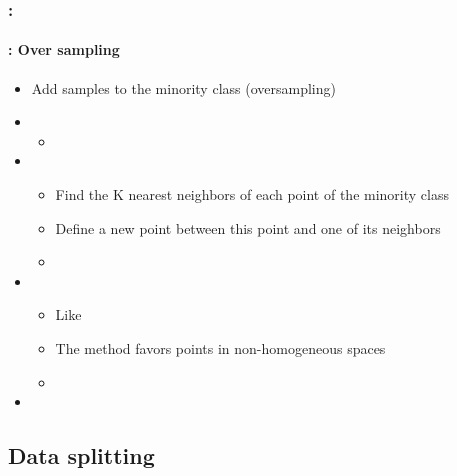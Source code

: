 \documentclass[xcolor=table]{beamer}
\begin{document}
\begin{frame}
	\frametitle{\insertshortsubtitle: \insertsection}
	\framesubtitle{\insertsubsection: Over sampling}
	
	\begin{itemize}
		\item Add samples to the minority class (oversampling)
		\item {}
		\begin{itemize}
			\item {}
		\end{itemize}
		\item {}
		\begin{itemize}
			\item Find the K nearest neighbors of each point of the minority class
			\item Define a new point between this point and one of its neighbors
			\item {}
		\end{itemize}
		\item {}
		\begin{itemize}
			\item Like 
			\item The method favors points in non-homogeneous spaces
			\item {}
		\end{itemize}
		\item {}
	\end{itemize}
	
\end{frame}

\subsection{Data splitting}
\end{document}
